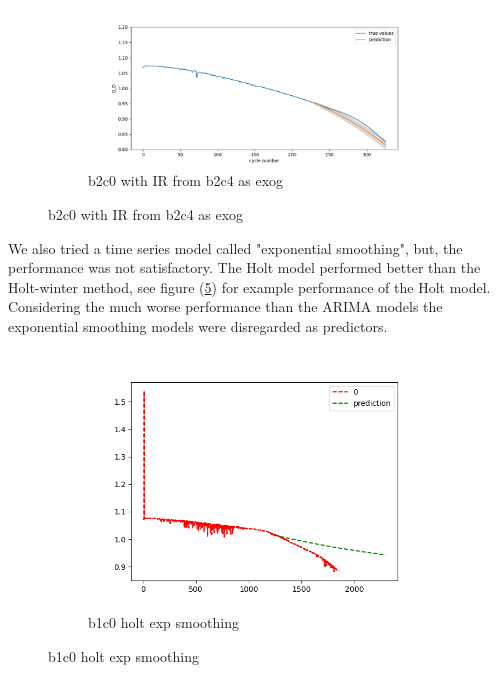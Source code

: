 \documentclass{article}
\begin{document}
\begin{figure}[H]
\begin{subfigure}{.5\textwidth}
  \label{fig2:sub3}
\end{subfigure}%
\begin{subfigure}{.5\textwidth}
  \centering
  \includegraphics[width=1\linewidth]{figs/auto_arima_exog(c4-IR)_03split_b2c0.png}
  \caption{b2c0 with IR from b2c4 as exog}
  \label{fig2:sub3}
\end{subfigure}
\end{figure}

We also tried a time series model called "exponential smoothing", but, the performance was not satisfactory. The Holt model performed better than the Holt-winter method, see figure (\ref{fig:exp_holt}) for example performance of the Holt model. Considering the much worse performance than the ARIMA models the exponential smoothing models were disregarded as predictors.

\begin{figure}[H]
\centering
    \begin{subfigure}{.5\textwidth}
  \centering
  \includegraphics[width=1\linewidth]{figs/holt_exp_smooth_split07.png}
  \caption{b1c0 holt exp smoothing}
  \label{fig:exp_holt}
\end{subfigure}%
\end{figure}
\end{document}
